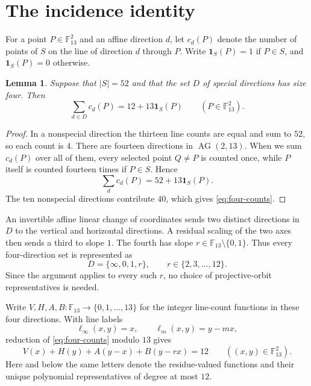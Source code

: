 \documentclass[11pt]{amsart}
\newtheorem{lemma}[theorem]{Lemma}
\theoremstyle{remark}
\newcommand{\F}{\mathbb F}
\newcommand{\one}{\mathbf 1}
\newcommand{\AG}{\operatorname{AG}}
\begin{document}
\section{The incidence identity}\label{sec:incidence}

For a point $P\in\F_{13}^{2}$ and an affine direction $d$, let $c_d(P)$
denote the number of points of $S$ on the line of direction $d$ through $P$.
Write $\one_S(P)=1$ if $P\in S$, and $\one_S(P)=0$ otherwise.

\begin{lemma}\label{lem:incidence}
Suppose that $|S|=52$ and that the set $D$ of special directions has size
four.  Then
\begin{equation}\label{eq:four-counts}
  \sum_{d\in D}c_d(P)=12+13\one_S(P)
  \qquad(P\in\F_{13}^{2}).
\end{equation}
\end{lemma}

\begin{proof}
In a nonspecial direction the thirteen line counts are equal and sum to $52$,
so each count is $4$.  There are fourteen directions in $\AG(2,13)$.  When
we sum $c_d(P)$ over all of them, every selected point $Q\ne P$ is counted
once, while $P$ itself is counted fourteen times if $P\in S$.  Hence
\[
  \sum_d c_d(P)=52+13\one_S(P).
\]
The ten nonspecial directions contribute $40$, which gives
\eqref{eq:four-counts}.
\end{proof}

An invertible affine linear change of coordinates sends two distinct
directions in $D$ to the vertical and horizontal directions.  A residual
scaling of the two axes then sends a third to slope $1$.  The fourth has
slope $r\in\F_{13}\setminus\{0,1\}$.  Thus every four-direction set is
represented as
\[
  D=\{\infty,0,1,r\},
  \qquad r\in\{2,3,\ldots,12\}.
\]
Since the argument applies to every such $r$, no choice of projective-orbit
representatives is needed.

Write $V,H,A,B\colon\F_{13}\to\{0,1,\ldots,13\}$ for the integer line-count
functions in these four directions.  With line labels
\[
  \ell_\infty(x,y)=x,
  \qquad \ell_m(x,y)=y-mx,
\]
reduction of \eqref{eq:four-counts} modulo $13$ gives
\begin{equation}\label{eq:polynomial-identity}
  V(x)+H(y)+A(y-x)+B(y-rx)=12
  \qquad((x,y)\in\F_{13}^{2}).
\end{equation}
Here and below the same letters denote the residue-valued functions and their
unique polynomial representatives of degree at most $12$.
\end{document}
